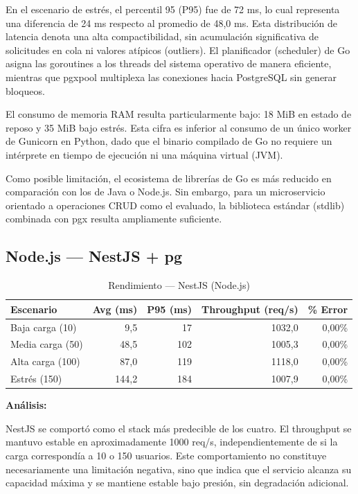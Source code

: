\documentclass[12pt,a4paper]{article}
\begin{document}
En el escenario de estrés, el percentil 95 (P95) fue de 72 ms, lo cual representa una diferencia de 24 ms respecto al promedio de 48,0 ms. Esta distribución de latencia denota una alta compactibilidad, sin acumulación significativa de solicitudes en cola ni valores atípicos (outliers). El planificador (scheduler) de Go asigna las goroutines a los threads del sistema operativo de manera eficiente, mientras que pgxpool multiplexa las conexiones hacia PostgreSQL sin generar bloqueos.

El consumo de memoria RAM resulta particularmente bajo: 18 MiB en estado de reposo y 35 MiB bajo estrés. Esta cifra es inferior al consumo de un único worker de Gunicorn en Python, dado que el binario compilado de Go no requiere un intérprete en tiempo de ejecución ni una máquina virtual (JVM).

Como posible limitación, el ecosistema de librerías de Go es más reducido en comparación con los de Java o Node.js. Sin embargo, para un microservicio orientado a operaciones CRUD como el evaluado, la biblioteca estándar (stdlib) combinada con pgx resulta ampliamente suficiente.

\subsection{Node.js --- NestJS + pg}

\begin{table}[h]
\centering
\small
\begin{tabular}{lrrrr}
\toprule
\textbf{Escenario} & \textbf{Avg (ms)} & \textbf{P95 (ms)} & \textbf{Throughput (req/s)} & \textbf{\% Error} \\
\midrule
Baja carga (10)  & 9,5  & 17  & 1032,0 & 0,00\% \\
Media carga (50) & 48,5 & 102 & 1005,3 & 0,00\% \\
Alta carga (100) & 87,0 & 119 & 1118,0 & 0,00\% \\
Estrés (150)     & 144,2& 184 & 1007,9 & 0,00\% \\
\bottomrule
\end{tabular}
\caption{Rendimiento --- NestJS (Node.js)}
\end{table}

\vspace{0.3cm}
\textbf{Análisis:}

NestJS se comportó como el stack más predecible de los cuatro. El throughput se mantuvo estable en aproximadamente 1000 req/s, independientemente de si la carga correspondía a 10 o 150 usuarios. Este comportamiento no constituye necesariamente una limitación negativa, sino que indica que el servicio alcanza su capacidad máxima y se mantiene estable bajo presión, sin degradación adicional.
\end{document}
